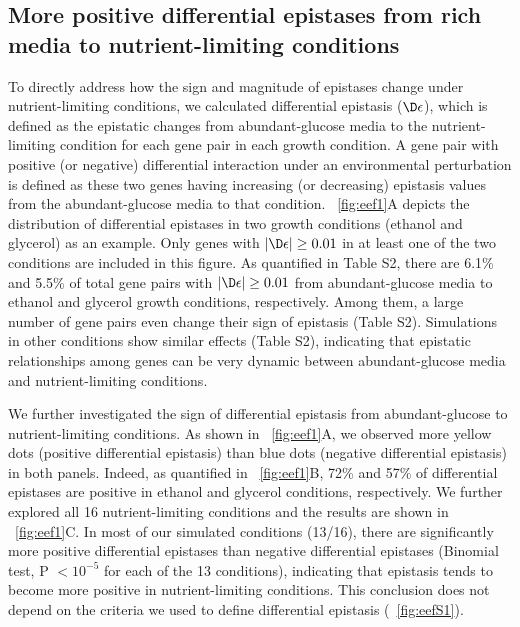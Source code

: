 \subsection{More positive differential epistases from rich media to
nutrient-limiting conditions}

To directly address how the sign and magnitude of epistases change
under nutrient-limiting conditions, we calculated differential
epistasis ($\D\epsilon$), which is defined as the epistatic changes from
abundant-glucose media to the nutrient-limiting condition for each
gene pair in each growth condition. A gene pair with positive (or
negative) differential interaction under an environmental perturbation
is defined as these two genes having increasing (or decreasing)
epistasis values from the abundant-glucose media to that
condition. \Fig~\ref{fig:eef1}A depicts the
distribution of differential
epistases in two growth conditions (ethanol and glycerol) as an
example. Only genes with $\left|\D\epsilon\right| \geq 0.01$ in at least
one of the two conditions are included in this figure. As quantified
in Table S2, there are 6.1\% and 5.5\% of total gene pairs with
$\left|\D\epsilon\right| \geq 0.01$ from abundant-glucose media to ethanol
and glycerol growth conditions, respectively. Among them, a large
number of gene pairs even change their sign of epistasis (Table
S2). Simulations in other conditions show similar effects (Table S2),
indicating that epistatic relationships among genes can be very
dynamic between abundant-glucose media and nutrient-limiting
conditions.


We further investigated the sign of differential epistasis from
abundant-glucose to nutrient-limiting conditions. As shown in \Fig~\ref{fig:eef1}A, 
we observed more yellow dots (positive differential epistasis)
than blue dots (negative differential epistasis) in both
panels. Indeed, as quantified in \Fig~\ref{fig:eef1}B, 72\% and 57\% of
differential epistases are positive in ethanol and glycerol
conditions, respectively. We further explored all 16 nutrient-limiting
conditions and the results are shown in \Fig~\ref{fig:eef1}C. In most of our
simulated conditions (13/16), there are significantly more positive
differential epistases than negative differential epistases (Binomial
test, P $< 10^{-5}$ for each of the 13 conditions), indicating that
epistasis tends to become more positive in nutrient-limiting
conditions. This conclusion does not depend on the criteria we used to
define differential epistasis (\Fig~\ref{fig:eefS1}).

